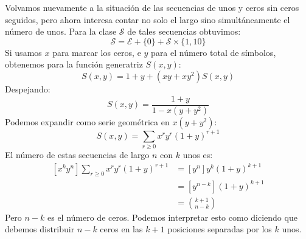   Volvamos nuevamente
  a la situación de las secuencias de unos y ceros
  sin ceros seguidos,
  pero ahora interesa contar no solo el largo
  sino simultáneamente el número de unos.
  Para la clase \(\mathcal{S}\) de tales secuencias obtuvimos:
  \begin{equation*}
    \mathcal{S}
      = \mathcal{E} + \{0\} + \mathcal{S} \times \{1, 10\}
  \end{equation*}
  Si usamos \(x\) para marcar los ceros,
  e \(y\) para el número total de símbolos,
  obtenemos para la función generatriz \(S(x, y)\):%
  \begin{equation*}
    S(x, y)
      = 1 + y + (x y + x y^2) S(x, y)
  \end{equation*}
  Despejando:
  \begin{equation*}
    S(x, y)
      = \frac{1 + y}{1 - x (y + y^2)}
  \end{equation*}
  Podemos expandir como serie geométrica en \(x (y + y^2)\):
  \begin{equation*}
    S(x, y)
      = \sum_{r \ge 0} x^r y^r (1 + y)^{r + 1}
  \end{equation*}
  El número de estas secuencias de largo \(n\) con \(k\) unos es:
  \begin{align*}
    \left[ x^k y^n \right] \sum_{r \ge 0} x^r y^r (1 + y)^{r + 1}
      &= \left[ y^n \right] y^k (1 + y)^{k + 1} \\
      &= \left[ y^{n - k} \right] (1 + y)^{k + 1} \\
      &= \binom{k + 1}{n - k}
  \end{align*}
  Pero \(n - k\) es el número de ceros.
  Podemos interpretar esto
  como diciendo que debemos distribuir \(n - k\) ceros
  en las \(k + 1\) posiciones separadas por los \(k\) unos.

